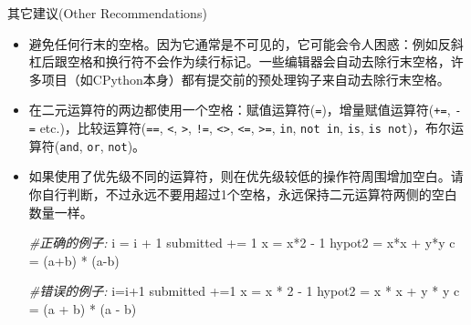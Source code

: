 \documentclass[ignorenonframetext,9pt]{beamer}
\newenvironment{Shaded}{}{}
\newcommand{\CommentTok}[1]{\textcolor[rgb]{0.38,0.63,0.69}{\textit{#1}}}
\newcommand{\DecValTok}[1]{\textcolor[rgb]{0.25,0.63,0.44}{#1}}
\newcommand{\NormalTok}[1]{#1}
\newcommand{\OperatorTok}[1]{\textcolor[rgb]{0.40,0.40,0.40}{#1}}
\providecommand{\tightlist}{%
  \setlength{\itemsep}{0pt}\setlength{\parskip}{0pt}}
\begin{document}
\begin{frame}{其它建议(Other Recommendations)}

\begin{block}

\begin{itemize}
\tightlist
\item
  避免任何行末的空格。因为它通常是不可见的，它可能会令人困惑：例如反斜杠后跟空格和换行符不会作为续行标记。一些编辑器会自动去除行末空格，许多项目（如CPython本身）都有提交前的预处理钩子来自动去除行末空格。
\vspace{.5cm}
\item
  在二元运算符的两边都使用一个空格：赋值运算符(\texttt{=})，增量赋值运算符(\texttt{+=},
  \texttt{-=} etc.)，比较运算符(\texttt{==}, \texttt{\textless{}},
  \texttt{\textgreater{}}, \texttt{!=},
  \texttt{\textless{}\textgreater{}}, \texttt{\textless{}=},
  \texttt{\textgreater{}=}, \texttt{in}, \texttt{not\ in}, \texttt{is},
  \texttt{is\ not})，布尔运算符(\texttt{and}, \texttt{or},
  \texttt{not})。
\end{itemize}

\end{block}

\end{frame}

\begin{frame}[fragile]

\begin{itemize}
\item
  如果使用了优先级不同的运算符，则在优先级较低的操作符周围增加空白。请你自行判断，不过永远不要用超过1个空格，永远保持二元运算符两侧的空白数量一样。

\begin{Shaded}
\begin{Highlighting}[]
\CommentTok{#正确的例子:}
\NormalTok{i }\OperatorTok{=}\NormalTok{ i }\OperatorTok{+} \DecValTok{1}
\NormalTok{submitted }\OperatorTok{+=} \DecValTok{1}
\NormalTok{x }\OperatorTok{=}\NormalTok{ x}\OperatorTok{*}\DecValTok{2} \OperatorTok{-} \DecValTok{1}
\NormalTok{hypot2 }\OperatorTok{=}\NormalTok{ x}\OperatorTok{*}\NormalTok{x }\OperatorTok{+}\NormalTok{ y}\OperatorTok{*}\NormalTok{y}
\NormalTok{c }\OperatorTok{=}\NormalTok{ (a}\OperatorTok{+}\NormalTok{b) }\OperatorTok{*}\NormalTok{ (a}\OperatorTok{-}\NormalTok{b)}

\CommentTok{#错误的例子:}
\NormalTok{i}\OperatorTok{=}\NormalTok{i}\OperatorTok{+}\DecValTok{1}
\NormalTok{submitted }\OperatorTok{+=}\DecValTok{1}
\NormalTok{x }\OperatorTok{=}\NormalTok{ x }\OperatorTok{*} \DecValTok{2} \OperatorTok{-} \DecValTok{1}
\NormalTok{hypot2 }\OperatorTok{=}\NormalTok{ x }\OperatorTok{*}\NormalTok{ x }\OperatorTok{+}\NormalTok{ y }\OperatorTok{*}\NormalTok{ y}
\NormalTok{c }\OperatorTok{=}\NormalTok{ (a }\OperatorTok{+}\NormalTok{ b) }\OperatorTok{*}\NormalTok{ (a }\OperatorTok{-}\NormalTok{ b)}
\end{Highlighting}
\end{Shaded}
\end{itemize}

\end{frame}
\end{document}
